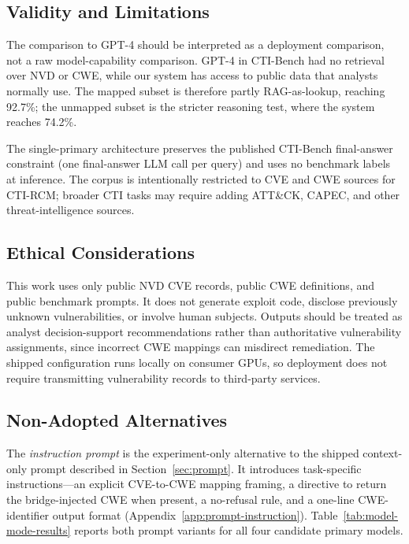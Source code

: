 \subsection{Validity and Limitations}

The comparison to GPT-4 should be interpreted as a deployment comparison, not a raw model-capability comparison. GPT-4 in CTI-Bench had no retrieval over NVD or CWE, while our system has access to public data that analysts normally use. The mapped subset is therefore partly RAG-as-lookup, reaching 92.7\%; the unmapped subset is the stricter reasoning test, where the system reaches 74.2\%.

The single-primary architecture preserves the published CTI-Bench final-answer constraint (one final-answer LLM call per query) and uses no benchmark labels at inference. The corpus is intentionally restricted to CVE and CWE sources for CTI-RCM; broader CTI tasks may require adding ATT\&CK, CAPEC, and other threat-intelligence sources.

\subsection{Ethical Considerations}

This work uses only public NVD CVE records, public CWE definitions, and public benchmark prompts. It does not generate exploit code, disclose previously unknown vulnerabilities, or involve human subjects. Outputs should be treated as analyst decision-support recommendations rather than authoritative vulnerability assignments, since incorrect CWE mappings can misdirect remediation. The shipped configuration runs locally on consumer GPUs, so deployment does not require transmitting vulnerability records to third-party services.

\subsection{Non-Adopted Alternatives}
\label{sec:non-adopted}

The \emph{instruction prompt} is the experiment-only alternative to the shipped context-only prompt described in Section~\ref{sec:prompt}. It introduces task-specific instructions---an explicit CVE-to-CWE mapping framing, a directive to return the bridge-injected CWE when present, a no-refusal rule, and a one-line CWE-identifier output format (Appendix~\ref{app:prompt-instruction}). Table~\ref{tab:model-mode-results} reports both prompt variants for all four candidate primary models.

